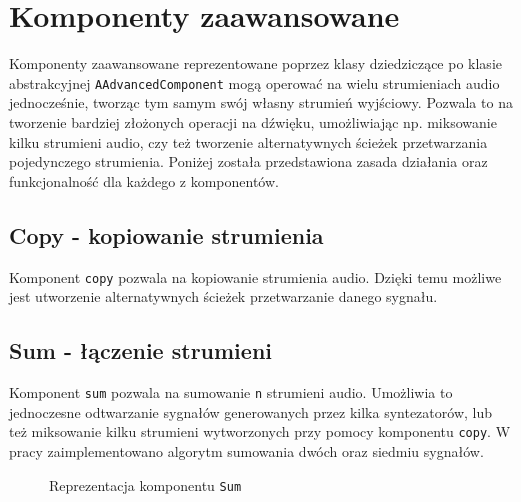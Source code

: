 \section{Komponenty zaawansowane}
Komponenty zaawansowane reprezentowane poprzez klasy dziedziczące po klasie abstrakcyjnej \texttt{AAdvancedComponent} mogą operować na wielu strumieniach audio jednocześnie, tworząc tym samym swój własny strumień wyjściowy. Pozwala to na tworzenie bardziej złożonych operacji na dźwięku, umożliwiając np. miksowanie kilku strumieni audio, czy też tworzenie alternatywnych ścieżek przetwarzania pojedynczego strumienia. Poniżej została przedstawiona zasada działania oraz funkcjonalność dla każdego z komponentów.

\subsection{Copy - kopiowanie strumienia}
Komponent \texttt{copy} pozwala na kopiowanie strumienia audio. Dzięki temu możliwe jest utworzenie alternatywnych ścieżek przetwarzanie danego sygnału.

\subsection{Sum - łączenie strumieni}
Komponent \texttt{sum} pozwala na sumowanie \texttt{n} strumieni audio. Umożliwia to jednoczesne odtwarzanie sygnałów generowanych przez kilka syntezatorów, lub też miksowanie kilku strumieni wytworzonych przy pomocy komponentu \texttt{copy}. W pracy zaimplementowano algorytm sumowania dwóch oraz siedmiu sygnałów.

\begin{figure}[H]
    \centering
    
    \caption{Reprezentacja komponentu \texttt{Sum}}
    \label{fig:Reprezentacja komponentu Sum}
\end{figure}